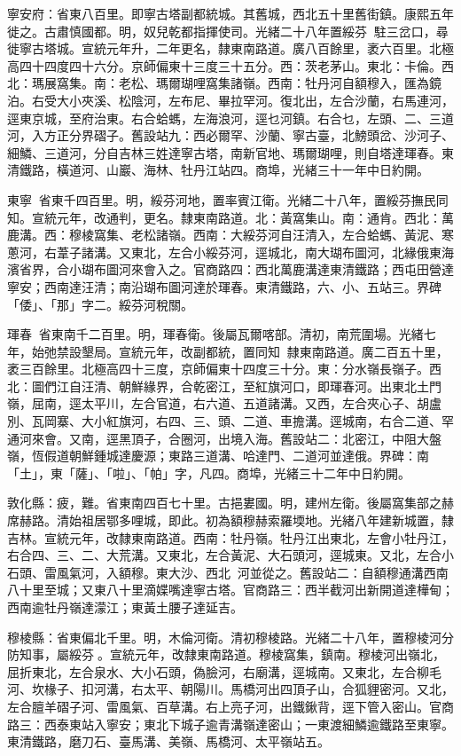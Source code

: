 \begin{pinyinscope}
寧安府：省東八百里。即寧古塔副都統城。其舊城，西北五十里舊街鎮。康熙五年徙之。古肅慎國都。明，奴兒乾都指揮使司。光緒二十八年置綏芬，駐三岔口，尋徙寧古塔城。宣統元年升，二年更名，隸東南路道。廣八百餘里，袤六百里。北極高四十四度四十六分。京師偏東十三度三十五分。西：茨老茅山。東北：卡倫。西北：瑪展窩集。南：老松、瑪爾瑚哩窩集諸嶺。西南：牡丹河自額穆入，匯為鏡泊。右受大小夾溪、松陰河，左布尼、畢拉罕河。復北出，左合沙蘭，右馬連河，逕東京城，至府治東。右合蛤螞，左海浪河，逕乜河鎮。右合乜，左頭、二、三道河，入方正分界磖子。舊設站九：西必爾罕、沙蘭、寧古臺，北鰟頭岔、沙河子、細鱗、三道河，分自吉林三姓達寧古塔，南新官地、瑪爾瑚哩，則自塔達琿春。東清鐵路，橫道河、山巖、海林、牡丹江站四。商埠，光緒三十一年中日約開。

東寧：省東千四百里。明，綏芬河地，置率賓江衛。光緒二十八年，置綏芬撫民同知。宣統元年，改通判，更名。隸東南路道。北：黃窩集山。南：通肯。西北：萬鹿溝。西：穆棱窩集、老松諸嶺。西南：大綏芬河自汪清入，左合蛤螞、黃泥、寒蔥河，右葦子諸溝。又東北，左合小綏芬河，逕城北，南大瑚布圖河，北緣俄東海濱省界，合小瑚布圖河來會入之。官商路四：西北萬鹿溝達東清鐵路；西屯田營達寧安；西南達汪清；南沿瑚布圖河達於琿春。東清鐵路，六、小、五站三。界碑「倭」、「那」字二。綏芬河稅關。

琿春：省東南千二百里。明，琿春衛。後屬瓦爾喀部。清初，南荒圍場。光緒七年，始弛禁設墾局。宣統元年，改副都統，置同知，隸東南路道。廣二百五十里，袤三百餘里。北極高四十三度，京師偏東十四度三十分。東：分水嶺長嶺子。西北：圖們江自汪清、朝鮮緣界，合乾密江，至紅旗河口，即琿春河。出東北土門嶺，屈南，逕太平川，左合官道，右六道、五道諸溝。又西，左合夾心子、胡盧別、瓦岡寨、大小紅旗河，右四、三、頭、二道、車擔溝。逕城南，右合二道、罕通河來會。又南，逕黑頂子，合圈河，出境入海。舊設站二：北密江，中阻大盤嶺，恆假道朝鮮鍾城達慶源；東路三道溝、哈達門、二道河並達俄。界碑：南「土」，東「薩」、「啦」、「帕」字，凡四。商埠，光緒三十二年中日約開。

敦化縣：疲，難。省東南四百七十里。古挹婁國。明，建州左衛。後屬窩集部之赫席赫路。清始祖居鄂多哩城，即此。初為額穆赫索羅堧地。光緒八年建新城置，隸吉林。宣統元年，改隸東南路道。西南：牡丹嶺。牡丹江出東北，左會小牡丹江，右合四、三、二、大荒溝。又東北，左合黃泥、大石頭河，逕城東。又北，左合小石頭、雷風氣河，入額穆。東大沙、西北河並從之。舊設站二：自額穆通溝西南八十里至城；又東八十里滴媟嘴達寧古塔。官商路三：西半截河出新開道達樺甸；西南逾牡丹嶺達濛江；東黃土腰子達延吉。

穆棱縣：省東偏北千里。明，木倫河衛。清初穆棱路。光緒二十八年，置穆棱河分防知事，屬綏芬。宣統元年，改隸東南路道。穆棱窩集，鎮南。穆棱河出嶺北，屈折東北，左合泉水、大小石頭，偽臉河，右廟溝，逕城南。又東北，左合柳毛河、坎椽子、扣河溝，右太平、朝陽川。馬橋河出四頂子山，合狐貍密河。又北，左合膻羊磖子河、雷風氣、百草溝。右上亮子河，出鐵鍬背，逕下管入密山。官商路三：西泰東站入寧安；東北下城子逾青溝嶺達密山；一東渡細鱗逾鐵路至東寧。東清鐵路，磨刀石、臺馬溝、美嶺、馬橋河、太平嶺站五。


\end{pinyinscope}

